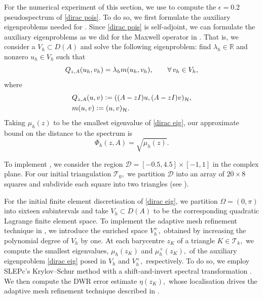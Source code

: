 For the numerical experiment of this section, we use  to compute the $\epsilon = 0.2$ pseudospectrum of \eqref{dirac pois}.
To do so, we first formulate the auxiliary eigenproblems needed for . Since \eqref{dirac pois} is self-adjoint, we can formulate the auxiliary eigenproblems as we did for the Maxwell operator in . That is, we consider a $V_h \subset D(A)$ and solve the following eigenproblem: find $\lambda_h \in \mathbb{R}$ and nonzero $u_h \in V_h$ such that
\begin{equation} \label{dirac eig}
    Q_{z, A}(u_h, v_h) = \lambda_h m(u_h, v_h), \qquad \operatorname{\forall} v_h \in V_h,
\end{equation}
where
\begin{align}
    &Q_{z, A}(u, v) \vcentcolon= ((A-zI) u, (A-zI) v)_{\mathcal{H}},\\
    &m(u, v) \vcentcolon= (u, v)_{\mathcal{H}}.
\end{align}
Taking $\mu_h(z)$ to be the smallest eigenvalue of \eqref{dirac eig}, our approximate bound on the distance to the spectrum is
\begin{equation}
    \Phi_h(z, A) = \sqrt{\mu_h(z)}.
\end{equation}



 To implement , we consider the region $\mathcal{D} = [-0.5, 4.5] \times [-1, 1]$ in the complex plane. For our initial triangulation $\mathcal{T}_0,$ we partition $\mathcal{D}$ into an
array of $20 \times 8$ squares and subdivide each square into two triangles (see ).  

  For the initial finite element discretisation of \eqref{dirac eig}, we partition $\Omega = (0, \pi)$ into sixteen subintervals and take $V_h \subset D(A)$ to be the corresponding quadratic Lagrange finite element space. 
  To implement the adaptive mesh refinement technique in , we introduce the enriched space $V_h^+,$ obtained by increasing the polynomial degree of $V_h$ by one.
  At each barycentre $z_K$ of a triangle $K \in \mathcal{T}_k,$ we compute the smallest eigenvalues, 
  $\mu_h(z_K)$ and $\mu_h^+(z_K),$ of the auxiliary eigenproblem \eqref{dirac eig} posed in $V_h$ and $V_h^+,$ respectively. To do so, we employ SLEPc's Krylov--Schur method with a shift-and-invert spectral transformation \cite{krylov, slep}. We then compute the DWR error estimate $\eta(z_K),$ whose localisation drives the adaptive mesh refinement technique described in .
  

